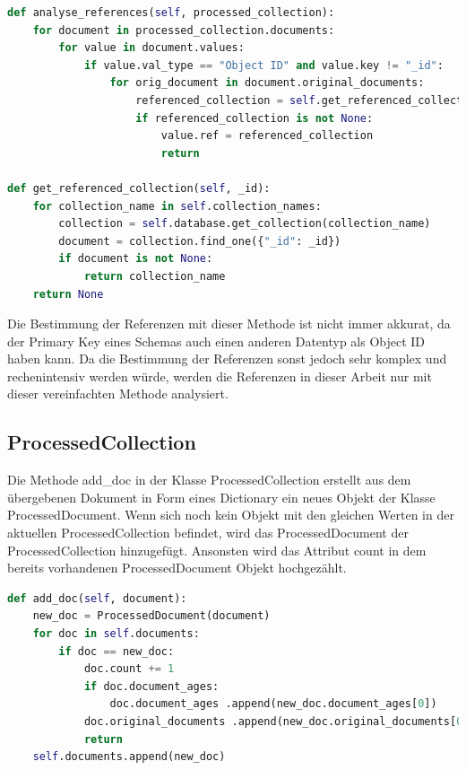 \begin{lstlisting}[language=python, caption={DatabaseAnalysis.analyse\_references},label={lst:backend_analyse_ref}]
def analyse_references(self, processed_collection):
    for document in processed_collection.documents:
        for value in document.values:
            if value.val_type == "Object ID" and value.key != "_id":
                for orig_document in document.original_documents:
                    referenced_collection = self.get_referenced_collection (orig_document.get(value.key))
                    if referenced_collection is not None:
                        value.ref = referenced_collection
                        return

def get_referenced_collection(self, _id):
    for collection_name in self.collection_names:
        collection = self.database.get_collection(collection_name)
        document = collection.find_one({"_id": _id})
        if document is not None:
            return collection_name
    return None
\end{lstlisting}

Die Bestimmung der Referenzen mit dieser Methode ist nicht immer akkurat, da der Primary Key eines Schemas auch einen anderen Datentyp als Object ID haben kann.
Da die Bestimmung der Referenzen sonst jedoch sehr komplex und rechenintensiv werden würde, werden die Referenzen in dieser Arbeit nur mit dieser vereinfachten Methode analysiert.

\subsection{ProcessedCollection}
\label{sub:ba_processed_collection}

Die Methode add\_doc in der Klasse ProcessedCollection erstellt aus dem übergebenen Dokument in Form eines Dictionary ein neues Objekt der Klasse ProcessedDocument.
Wenn sich noch kein Objekt mit den gleichen Werten in der aktuellen ProcessedCollection befindet, wird das ProcessedDocument der ProcessedCollection hinzugefügt.
Ansonsten wird das Attribut count in dem bereits vorhandenen ProcessedDocument Objekt hochgezählt.


\begin{lstlisting}[language=python, caption={ProcessedCollection.add\_doc},label={lst:backend_add_doc}]
def add_doc(self, document):
    new_doc = ProcessedDocument(document)
    for doc in self.documents:
        if doc == new_doc:
            doc.count += 1
            if doc.document_ages:
                doc.document_ages .append(new_doc.document_ages[0])
            doc.original_documents .append(new_doc.original_documents[0])
            return
    self.documents.append(new_doc)
\end{lstlisting}

